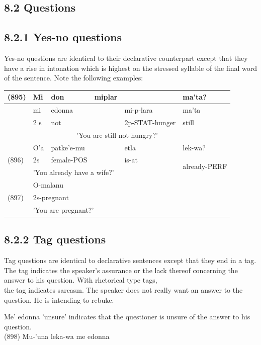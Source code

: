 \documentclass[10pt]{article}
\begin{document}
\subsection*{8.2 Questions}
\subsection*{8.2.1 Yes-no questions}
Yes-no questions are identical to their declarative counterpart except that they have a rise in intonation which is highest on the stressed syllable of the final word of the sentence. Note the following examples:

\begin{center}
\begin{tabular}{|l|l|l|l|l|l|}
\hline
(895) & Mi & don & miplar &  & ma'ta? \\
\hline
 & mi & edonna &  & mi-p-lara & ma'ta \\
\hline
 & 2 s & not &  & 2p-STAT-hunger & still \\
\hline
\multicolumn{6}{|c|}{'You are still not hungry?'} \\
\hline
\multirow[t]{3}{*}{(896)} & O’a & patke'e-mu &  & etla & lek-wa? \\
\hline
 & 2s & female-POS &  & is-at & \multirow[t]{2}{*}{already-PERF} \\
\hline
 & \multicolumn{5}{|l|}{'You already have a wife?'} \\
\hline
\multirow[t]{3}{*}{(897)} & \multicolumn{5}{|l|}{O-malanu} \\
\hline
 & \multicolumn{5}{|l|}{2s-pregnant} \\
\hline
 & \multicolumn{5}{|l|}{'You are pregnant?'} \\
\hline
\end{tabular}
\end{center}

\subsection*{8.2.2 Tag questions}
Tag questions are identical to declarative sentences except that they end in a tag. The tag indicates the speaker's assurance or the lack thereof concerning the answer to his question. With rhetorical type tags,\\
the tag indicates sarcasm. The speaker does not really want an answer to the question. He is intending to rebuke.

Me' edonna 'unsure' indicates that the questioner is unsure of the answer to his question.\\
(898) Mu-'una leka-wa me edonna
\end{document}
